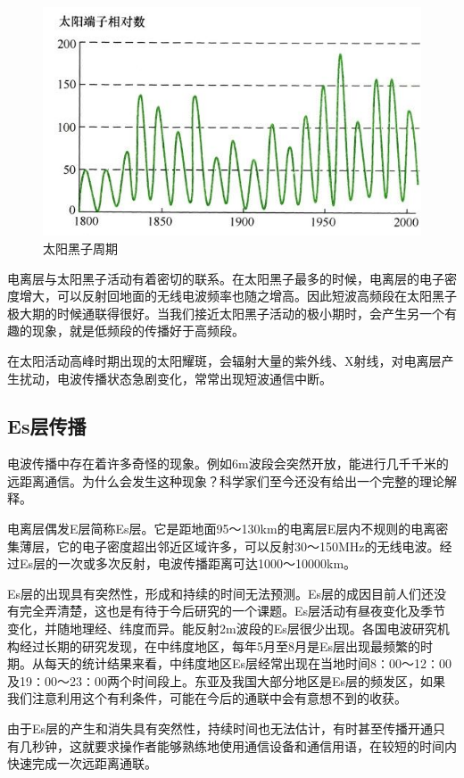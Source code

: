 \documentclass[12pt,UTF8]{ctexbook}
\begin{document}
\begin{figure}[htbp]
	\centering
	\includegraphics[width=0.7\linewidth]{57}
	\caption{太阳黑子周期}
	\label{fig:1}
\end{figure}

电离层与太阳黑子活动有着密切的联系。在太阳黑子最多的时候，电离层的电子密度增大，可以反射回地面的无线电波频率也随之增高。因此短波高频段在太阳黑子极大期的时候通联得很好。当我们接近太阳黑子活动的极小期时，会产生另一个有趣的现象，就是低频段的传播好于高频段。

在太阳活动高峰时期出现的太阳耀斑，会辐射大量的紫外线、X射线，对电离层产生扰动，电波传播状态急剧变化，常常出现短波通信中断。

\subsection{Es层传播}

电波传播中存在着许多奇怪的现象。例如6m波段会突然开放，能进行几千千米的远距离通信。为什么会发生这种现象？科学家们至今还没有给出一个完整的理论解释。

电离层偶发E层简称Es层。它是距地面95～130km的电离层E层内不规则的电离密集薄层，它的电子密度超出邻近区域许多，可以反射30～150MHz的无线电波。经过Es层的一次或多次反射，电波传播距离可达1000～10000km。

Es层的出现具有突然性，形成和持续的时间无法预测。Es层的成因目前人们还没有完全弄清楚，这也是有待于今后研究的一个课题。Es层活动有昼夜变化及季节变化，并随地理经、纬度而异。能反射2m波段的Es层很少出现。各国电波研究机构经过长期的研究发现，在中纬度地区，每年5月至8月是Es层出现最频繁的时期。从每天的统计结果来看，中纬度地区Es层经常出现在当地时间8∶00～12∶00及19∶00～23∶00两个时间段上。东亚及我国大部分地区是Es层的频发区，如果我们注意利用这个有利条件，可能在今后的通联中会有意想不到的收获。

由于Es层的产生和消失具有突然性，持续时间也无法估计，有时甚至传播开通只有几秒钟，这就要求操作者能够熟练地使用通信设备和通信用语，在较短的时间内快速完成一次远距离通联。
\end{document}
